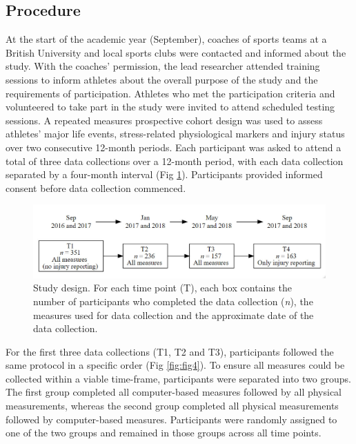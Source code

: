 \documentclass[
  english,
  man]{apa6}
\begin{document}
\hypertarget{procedure}{%
\subsection{Procedure}\label{procedure}}

At the start of the academic year (September), coaches of sports teams at a British University and local sports clubs were contacted and informed about the study. With the coaches' permission, the lead researcher attended training sessions to inform athletes about the overall purpose of the study and the requirements of participation. Athletes who met the participation criteria and volunteered to take part in the study were invited to attend scheduled testing sessions. A repeated measures prospective cohort design was used to assess athletes' major life events, stress-related physiological markers and injury status over two consecutive 12-month periods. Each participant was asked to attend a total of three data collections over a 12-month period, with each data collection separated by a four-month interval (Fig \ref{fig:fig3}). Participants provided informed consent before data collection commenced.

\begin{figure}
\includegraphics[width=1\linewidth]{figures_doc/Fig3} \caption{Study design. For each time point (T), each box contains the number of participants who completed the data collection (\textit{n}), the measures used for data collection and the approximate date of the data collection.}\label{fig:fig3}
\end{figure}

For the first three data collections (T1, T2 and T3), participants followed the same protocol in a specific order (Fig \ref{fig:fig4}).
To ensure all measures could be collected within a viable time-frame, participants were separated into two groups.
The first group completed all computer-based measures followed by all physical measurements, whereas the second group completed all physical measurements followed by computer-based measures.
Participants were randomly assigned to one of the two groups and remained in those groups across all time points.
\end{document}
